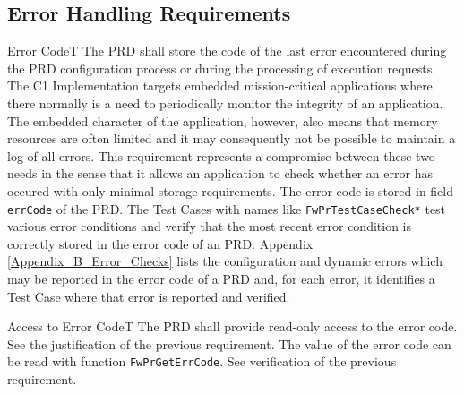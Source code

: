 \documentclass[a4paper,10pt]{article}
\newenvironment{fw_req}[6]
{\addtocounter{subsubsection}{1}
	\hspace{0.2cm}\textbf{FW-\arabic{section}.\arabic{subsection}.\arabic{subsubsection}/#2
	\hspace{0.8cm} #1}
	\vspace{-10pt}
\begin{longtable}{p{2.7cm}P{8.5cm}}
\hline
\textsc{Requirement} & #3 \\
\textsc{Justification} & #4 \\
\textsc{Implementation} & #5  \\ 
\textsc{Verification} & #6  \\
\hline
}
{\end{longtable}}
\begin{document}
\subsection{Error Handling Requirements}\label{req:errorCodePR}

\begin{fw_req}{Error Code}{T}
{The PRD shall store the code of the last error encountered during the PRD 
configuration process or during the processing of execution requests.}
{The C1 Implementation targets embedded mission-critical applications 
where there normally is a need to periodically monitor the integrity of an application. 
The embedded character of the application, however, also means that memory resources are often 
limited and it may consequently not be possible to maintain a log of all errors. 
This requirement represents a compromise between these two needs in the sense that it allows an 
application to check whether an error has occured with only minimal storage requirements.}
{The error code is stored in field \texttt{errCode} of the PRD.} 
{The Test Cases with names like \texttt{FwPrTestCaseCheck*} test various 
error conditions and verify that the most recent error condition is correctly stored in the error 
code of an PRD. 
Appendix \ref{Appendix_B_Error_Checks} lists the configuration and dynamic errors which may be 
reported in the error code of a PRD and, for each error, it identifies a Test Case where that 
error is reported and verified.}
\end{fw_req}


\begin{fw_req}{Access to Error Code}{T}
{The PRD shall provide read-only access to the error code.}
{See the justification of the previous requirement.}
{The value of the error code can be read with function 
\texttt{FwPrGetErrCode}.} 
{See verification of the previous requirement.}
\end{fw_req}
\end{document}
